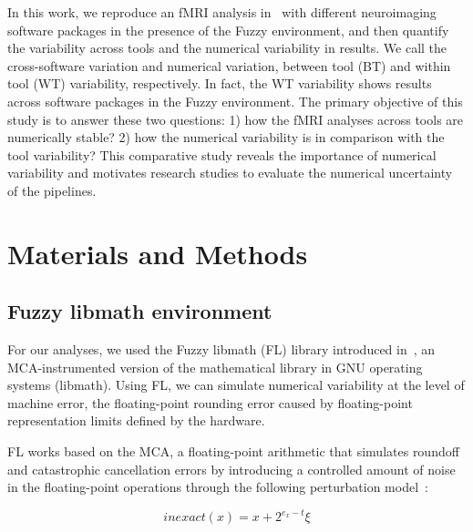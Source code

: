 \documentclass[conference]{IEEEtran}
\begin{document}
In this work, we reproduce an fMRI analysis in~\cite{bowring2019exploring} with different neuroimaging software packages in the presence of the Fuzzy environment,
and then quantify the variability across tools and the numerical variability in results.
We call the cross-software variation and numerical variation, between tool (BT) and within tool (WT) variability, respectively.
In fact, the WT variability shows results across software packages in the Fuzzy environment.
The primary objective of this study is to answer these two questions: 1) how the fMRI analyses across tools are numerically stable?
2) how the numerical variability is in comparison with the tool variability?
This comparative study reveals the importance of numerical variability and motivates research studies to evaluate the numerical uncertainty of the pipelines.



\section{Materials and Methods}

\subsection{Fuzzy libmath environment}

For our analyses, we used the Fuzzy libmath (FL) library introduced in~\cite{salari2021accurate}, an MCA-instrumented 
version of the mathematical library in GNU operating systems (libmath).
Using FL, we can simulate numerical variability at the level of machine error, the floating-point rounding error
caused by floating-point representation limits defined by the hardware.

FL works based on the MCA, a floating-point arithmetic that simulates roundoff and catastrophic cancellation errors
by introducing a controlled amount of noise in the floating-point operations 
through the following perturbation model~\cite{Parker1997-qq}:

\begin{equation} \label{eq:mca_inexact}
  inexact(x) = x + 2^{e_x-t}\xi
\end{equation}
\end{document}

